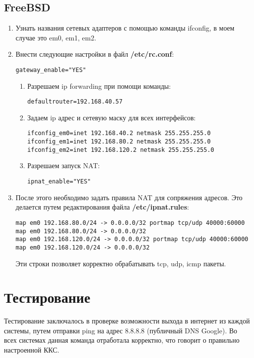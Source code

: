 \documentclass[a4paper, 12pt]{article}		%
\begin{document}
\subsection{FreeBSD}
\begin{enumerate}
\item Узнать названия сетевых адаптеров с помощью команды ifconfig, в моем случае это em0, em1, em2.
\item Внести следующие настройки в файл \textbf{/etc/rc.conf}:
\begin{lstlisting}[language={}]
gateway_enable="YES"
\end{lstlisting}
\begin{enumerate}
\item Разрешаем ip forwarding при помощи команды:
\begin{lstlisting}[language={}]
defaultrouter=192.168.40.57
\end{lstlisting}
\item Задаем ip адрес и сетевую маску для всех интерфейсов:
\begin{lstlisting}[language={}]
ifconfig_em0=inet 192.168.40.2 netmask 255.255.255.0
ifconfig_em1=inet 192.168.80.2 netmask 255.255.255.0
ifconfig_em2=inet 192.168.120.2 netmask 255.255.255.0
\end{lstlisting}
\item Разрешаем запуск NAT:
\begin{lstlisting}[language={}]
ipnat_enable="YES"
\end{lstlisting}
\end{enumerate}
\item После этого необходимо задать правила NAT для сопряжения адресов. Это делается путем редактирования файла \textbf{/etc/ipnat.rules}:
\begin{lstlisting}[language={}]
map em0 192.168.80.0/24 -> 0.0.0.0/32 portmap tcp/udp 40000:60000 
map em0 192.168.80.0/24 -> 0.0.0.0/32 
map em0 192.168.120.0/24 -> 0.0.0.0/32 portmap tcp/udp 40000:60000
map em0 192.168.120.0/24 -> 0.0.0.0/32
\end{lstlisting}
Эти строки позволяет корректно обрабатывать tcp, udp, icmp пакеты.
\end{enumerate}

\section{Тестирование}
Тестирование заключалось в проверке возможности выхода в интернет из каждой системы, путем отправки ping на адрес 8.8.8.8 (публичный DNS Google). Во всех системах данная команда отработала корректно, что говорит о правильно настроенной ККС.
\end{document}
